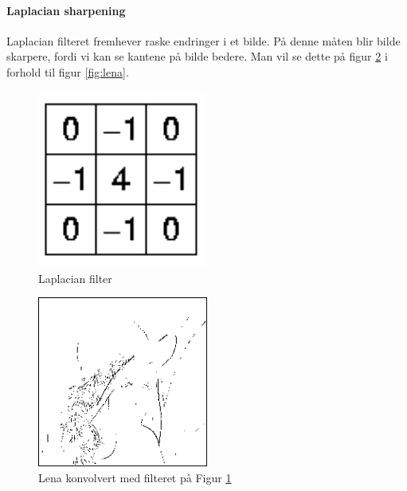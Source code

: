 \documentclass[a4paper, 12pt]{article}
\begin{document}
\paragraph{Laplacian sharpening}
Laplacian filteret fremhever raske endringer i et bilde. På denne måten blir bilde skarpere, fordi vi kan se kantene på bilde bedere. Man vil se dette på figur \ref{fig:lena-laplacian} i forhold til figur \ref{fig:lena}.

\begin{figure}[h]
  \centering
  \includegraphics[width=0.5\textwidth]{images/laplacian-filter}
  \caption{Laplacian filter}
  \label{fig:laplacian-filter}
\end{figure}

\begin{figure}[h]
  \centering
  \includegraphics[width=0.5\textwidth]{images/laplacian-lena}
  \caption{Lena konvolvert med filteret på Figur \ref{fig:laplacian-filter}}
  \label{fig:lena-laplacian}
\end{figure}
\end{document}
